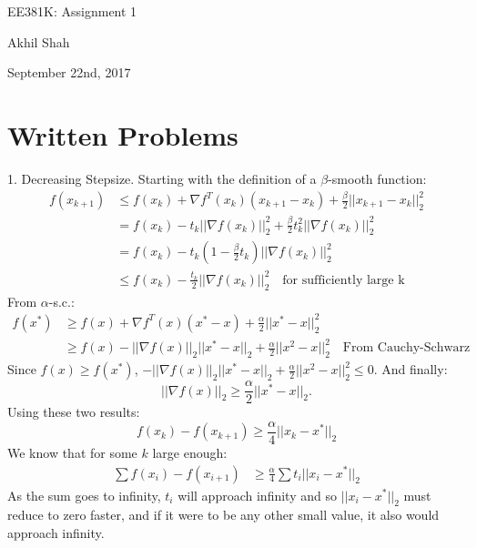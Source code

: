 \documentclass{article}
\begin{document}
\begin{center}
    {\huge EE381K: Assignment 1}
\end{center}
\begin{center}
    Akhil Shah
\end{center}
\begin{center}
    September 22nd, 2017
\end{center}

\section{Written Problems}
1. Decreasing Stepsize. \newline\newline
Starting with the definition of a $\beta$-smooth function:
\begin{align*}
	f(x_{k+1}) &\leq f(x_k)  + \nabla f^T(x_k)(x_{k+1} - x_{k}) + \frac{\beta}{2} || x_{k+1} - x_k ||^2_2 \\
	&= f(x_k) - t_k ||\nabla f(x_k) ||^2_2 + \frac{\beta}{2} t_k^2 || \nabla f(x_k) ||^2_2 \\
	&= f(x_k) - t_k(1-\frac{\beta}{2}t_k)||\nabla f(x_k) ||^2_2 \\
	&\leq f(x_k) - \frac{t_k}{2} ||\nabla f(x_k) ||^2_2 \quad \text{for sufficiently large k}
\end{align*}
\noindent
From $\alpha$-s.c.: 
\begin{align*}
	f(x^*) &\geq f(x) + \nabla f^T(x) (x^* - x) + \frac{\alpha}{2} || x^* - x ||^2_2 \\
	&\geq f(x) - || \nabla f(x)||_2||x^* - x||_2 + \frac{\alpha}{2} || x^2 - x ||^2_2 \quad \text{From Cauchy-Schwarz}
\end{align*}
Since $f(x) \geq f(x^*)$, $  - || \nabla f(x)||_2||x^* - x||_2 + \frac{\alpha}{2} || x^2 - x ||^2_2 \leq 0$. \newline
And finally:
\begin{equation*}
	|| \nabla f(x) ||_2 \geq \frac{\alpha}{2} ||x^* - x||_2.
\end{equation*}
Using these two results:
\begin{equation*}
	f(x_k) - f(x_{k+1}) \geq \frac{\alpha}{4} || x_{k} - x^*||_2
\end{equation*}
We know that for some $k$ large enough:
\begin{align*}
	\sum{f(x_i) - f(x_{i+1})} &\geq \frac{\alpha}{4} \sum{t_i ||x_i - x^* ||_2}
\end{align*}
As the sum goes to infinity, $t_i$ will approach infinity and so $||x_i - x^* ||_2$ must reduce to zero faster, and if it were to be any other small value, it also would approach infinity. \newline
\end{document}
